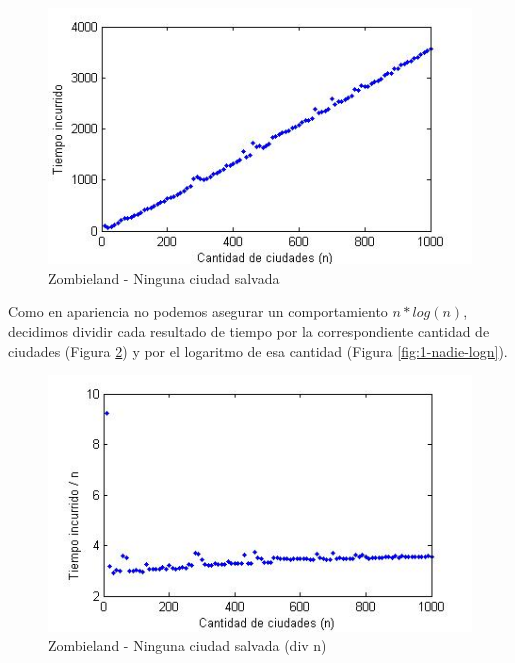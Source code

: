 \begin{figure}[htb]
	\begin{center}
    		\includegraphics[scale=0.5]{imagenes/1-nosesalvanadie.jpg}
	\end{center}
	\caption{Zombieland - Ninguna ciudad salvada}\label{fig:1-nadie}
\end{figure}

Como en apariencia no podemos asegurar un comportamiento $n*log(n)$, decidimos dividir cada resultado de tiempo por la correspondiente cantidad de ciudades (Figura \ref{fig:1-nadie-n}) y por el logaritmo de esa cantidad (Figura \ref{fig:1-nadie-logn}).

\begin{figure}[htb]
	\begin{center}
    		\includegraphics[scale=0.5]{imagenes/1-nosesalvanadie-div-n.jpg}
	\end{center}
	\caption{Zombieland - Ninguna ciudad salvada (div n)}\label{fig:1-nadie-n}
\end{figure}

